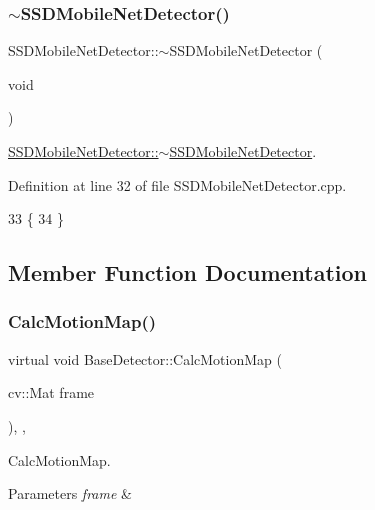 \subsubsection{\texorpdfstring{$\sim$\+S\+S\+D\+Mobile\+Net\+Detector()}{~SSDMobileNetDetector()}}
{\footnotesize\ttfamily S\+S\+D\+Mobile\+Net\+Detector\+::$\sim$\+S\+S\+D\+Mobile\+Net\+Detector (\begin{DoxyParamCaption}\item[{void}]{ }\end{DoxyParamCaption})}



\mbox{\hyperlink{class_s_s_d_mobile_net_detector_aab4a87e950c5d0ea2631f8f7d521dc1c}{S\+S\+D\+Mobile\+Net\+Detector\+::$\sim$\+S\+S\+D\+Mobile\+Net\+Detector}}. 



Definition at line 32 of file S\+S\+D\+Mobile\+Net\+Detector.\+cpp.


\begin{DoxyCode}
33 \{
34 \}
\end{DoxyCode}


\subsection{Member Function Documentation}
\mbox{\label{class_base_detector_a73c66f0d4dad263fcf65c09a6f6feda2}} 
\subsubsection{\texorpdfstring{Calc\+Motion\+Map()}{CalcMotionMap()}}
{\footnotesize\ttfamily virtual void Base\+Detector\+::\+Calc\+Motion\+Map (\begin{DoxyParamCaption}\item[{cv\+::\+Mat}]{frame }\end{DoxyParamCaption})\hspace{0.3cm}{\ttfamily [inline]}, {\ttfamily [virtual]}, {\ttfamily [inherited]}}



Calc\+Motion\+Map. 


\begin{DoxyParams}{Parameters}
{\em frame} & \\
\hline
\end{DoxyParams}


